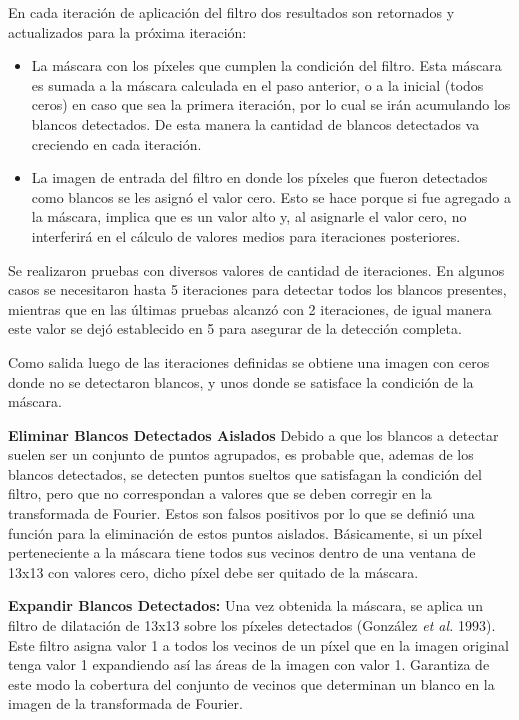 \documentclass[10pt,a4paper, twoside]{report}
\begin{document}
En cada iteración de aplicación del filtro dos resultados son retornados y actualizados para la próxima iteración:

\begin{itemize}
\item La máscara con los píxeles que cumplen la condición del filtro. Esta máscara es sumada a la máscara calculada en el paso anterior, o a la inicial (todos ceros) en caso que sea la primera iteración, por lo cual se irán acumulando los blancos detectados. De esta manera la cantidad de blancos detectados va creciendo en cada iteración.
\item La imagen de entrada del filtro en donde los píxeles que fueron detectados como blancos se les asignó el valor cero.  Esto se hace porque si fue agregado a la máscara, implica que es un valor alto y, al asignarle el valor cero, no interferirá en el cálculo de valores medios para iteraciones posteriores.
\end{itemize}

Se realizaron pruebas con diversos valores de cantidad de iteraciones. En algunos casos se necesitaron hasta 5 iteraciones para detectar todos los blancos presentes, mientras que en las últimas pruebas alcanzó con 2 iteraciones, de igual manera este valor se dejó establecido en 5 para asegurar de la detección completa.

Como salida luego de las iteraciones definidas se obtiene una imagen con ceros donde no se detectaron blancos, y unos donde se satisface la condición de la máscara.


\textbf{Eliminar Blancos Detectados Aislados} Debido a que los blancos a detectar suelen ser un conjunto de puntos agrupados, es probable que, ademas de los blancos detectados, se detecten puntos sueltos que satisfagan la condición del filtro, pero que no correspondan a valores que se deben corregir en la transformada de Fourier. Estos son falsos positivos por lo que se definió una función para la eliminación de estos puntos aislados. Básicamente, si un píxel perteneciente a la máscara tiene todos sus vecinos dentro de una ventana de 13x13 con valores cero, dicho píxel debe ser quitado de la máscara. 

\textbf{Expandir Blancos Detectados:} Una vez obtenida la máscara, se aplica un filtro de dilatación de 13x13 sobre los píxeles detectados (González \textit{et al.} 1993). Este filtro asigna valor 1 a todos los vecinos de un píxel que en la imagen original tenga valor 1 expandiendo así las áreas de la imagen con valor 1. Garantiza de este modo la cobertura del conjunto de vecinos que determinan un blanco en la imagen de la transformada de Fourier. 
\end{document}
